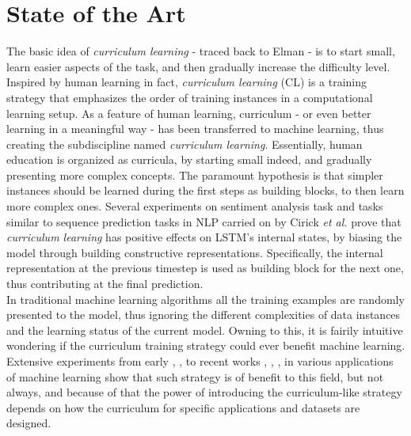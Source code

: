 \section{State of the Art}
The basic idea of \textit{curriculum learning} - traced back to Elman - is to start small, learn easier aspects
of the task, and then gradually increase the difficulty level.
Inspired by human learning in fact, \textit{curriculum learning} (CL) is a training strategy that emphasizes
the order of training instances in a computational learning setup.
As a feature of human learning, curriculum - or even better learning in a meaningful way -
has been transferred to machine learning, thus creating the subdiscipline named
\textit{curriculum learning}.
Essentially, human education is organized as curricula, by starting small indeed, and gradually presenting more complex
concepts. The paramount hypothesis is that simpler instances should be learned
during the first steps as building blocks, to then learn more complex ones. Several experiments on sentiment 
analysis task and tasks similar to sequence prediction tasks in NLP carried on by Cirick \textit{et al.} \cite{Cirik2016VisualizingAU} prove that
\textit{curriculum learning} has positive effects on LSTM's internal states, by biasing the model through building constructive representations. 
Specifically, the internal representation at the previous timestep is used as building block for the next one, thus
contributing at the final prediction.\\
In traditional machine learning algorithms all the training examples are randomly presented to the model,
thus ignoring the different complexities of data instances and the learning status of the current model. 
Owning to this, it is fairily intuitive wondering if the curriculum training strategy could ever benefit machine learning.
Extensive experiments from early \cite{bengio2009curriculum}, \cite{kumar2010self}, \cite{zaremba2014learning} to recent works \cite{fan2018learning}, \cite{graves2017automated}, \cite{hacohen2019power}, \cite{platanios2019competence} in various applications of machine learning show that such strategy is of benefit to this field, but not always, and 
because of that the power of introducing the curriculum-like strategy depends on how the curriculum for specific applications and datasets are designed.

